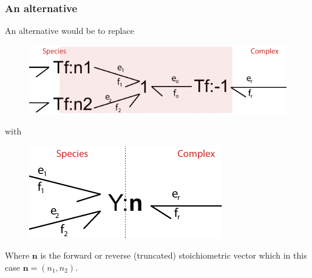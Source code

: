 \documentclass[10pt,reqno]{beamer}
\begin{document}
\begin{frame}
\frametitle{An alternative}
An alternative would be to replace
\begin{figure}
	\includegraphics[scale=0.5]{images/stoic_oster_Y}
\end{figure}
\begin{center}
with
\end{center}
\begin{figure}
\includegraphics[scale=0.5]{images/stoic_Y}
\end{figure}
Where $\mathbf{n}$ is the forward or reverse (truncated) stoichiometric vector which in this case $\mathbf{n} = (n_1,n_2)$.
\end{frame}
\end{document}
